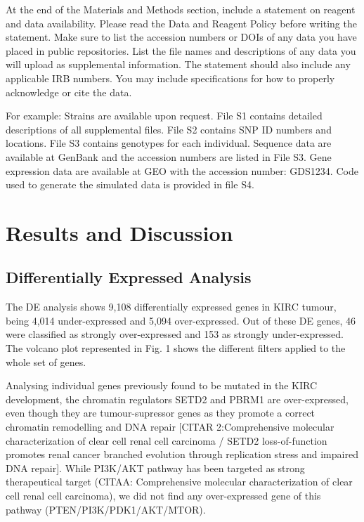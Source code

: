 \documentclass[9pt,twocolumn,twoside]{gsajnl}
\begin{document}
At the end of the Materials and Methods section, include a statement on reagent and data availability. Please read the Data and Reagent Policy before writing the statement. Make sure to list the accession numbers or DOIs of any data you have placed in public repositories. List the file names and descriptions of any data you will upload as supplemental information. The statement should also include any applicable IRB numbers. You may include specifications for how to properly acknowledge or cite the data.

For example: Strains are available upon request. File S1 contains detailed descriptions of all supplemental files. File S2 contains SNP ID numbers and locations. File S3 contains genotypes for each individual. Sequence data are available at GenBank and the accession numbers are listed in File S3. Gene expression data are available at GEO with the accession number: GDS1234. Code used to generate the simulated data is provided in file S4. 


\section*{Results and Discussion}
\subsection*{Differentially Expressed Analysis}
The DE analysis shows 9,108 differentially expressed genes in KIRC tumour, being 4,014 under-expressed and 5,094 over-expressed. Out of these DE genes, 46 were classified as strongly over-expressed and 153 as strongly under-expressed. The volcano plot represented in Fig. 1 shows the different filters applied to the whole set of genes.

Analysing individual genes previously found to be mutated in the KIRC development, the chromatin regulators SETD2 and PBRM1 are over-expressed, even though they are tumour-supressor genes as they promote a correct chromatin remodelling and DNA repair [CITAR 2:Comprehensive molecular characterization of clear cell renal cell carcinoma / SETD2 loss-of-function promotes renal cancer branched evolution through replication stress and impaired DNA repair]. While PI3K/AKT pathway has been targeted as strong therapeutical target (CITAA: Comprehensive molecular characterization of clear cell renal cell carcinoma), we did not find any over-expressed gene of this pathway (PTEN/PI3K/PDK1/AKT/MTOR).
\end{document}
